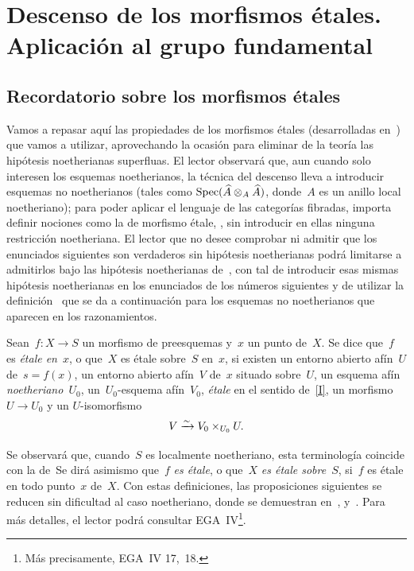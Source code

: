 \chapter[Descenso de los morfismos étales]{Descenso de los morfismos étales.\\ Aplicación al grupo fundamental}
\label{IX}

\section{Recordatorio sobre los morfismos étales}
\label{IX.1}

Vamos a repasar aquí las propiedades de los morfismos étales (desarrolladas
en~) que vamos a utilizar, aprovechando la ocasión para eliminar de
la teoría las hipótesis noetherianas superfluas. El lector observará que,
aun cuando solo interesen los esquemas noetherianos, la técnica del descenso
lleva a introducir esquemas no noetherianos (tales como
$\operatorname{Spec}(\widehat{A}\otimes_{A}\widehat{A})$, donde~$A$ es un anillo local
noetheriano); para poder aplicar el lenguaje de las categorías fibradas,
importa definir nociones como la de morfismo étale,
, sin introducir en ellas ninguna
restricción noetheriana.
El lector que no desee comprobar ni admitir que los enunciados siguientes
son verdaderos sin hipótesis noetherianas podrá limitarse a admitirlos bajo
las hipótesis noetherianas de~, con tal de introducir esas mismas
hipótesis noetherianas en los enunciados de los números siguientes y de
utilizar la definición~ que se da a continuación para los
esquemas no noetherianos que aparecen en los razonamientos.

\begin{definition}
\label{IX.1.1}
Sean~$f\colon X\to S$ un morfismo de preesquemas y~$x$ un punto de~$X$.
Se dice que~$f$ es \emph{étale en}~$x$,
%
o que~$X$ es étale sobre~$S$ en~$x$, si existen un entorno abierto
afín~$U$ de~$s=f(x)$, un entorno abierto afín~$V$ de~$x$ situado sobre~$U$,
un esquema afín \emph{noetheriano}~$U_{0}$, un~$U_{0}$-esquema
afín~$V_{0}$, \emph{étale} en el sentido de~\eqref{I}, un
morfismo~$U\to U_{0}$ y un
$U$-isomorfismo
$$
V\xrightarrow{\sim} V_{0}\times_{U_{0}}U.
$$
\end{definition}

Se observará
que, cuando~$S$ es localmente noetheriano, esta terminología coincide con
la de~\loccit Se dirá asimismo que~$f$ \emph{es étale}, o que~$X$
\emph{es étale sobre}~$S$, si~$f$ es étale en todo punto~$x$ de~$X$.
Con estas definiciones, las proposiciones siguientes se reducen sin
dificultad al caso noetheriano, donde se demuestran en~,
 y~. Para más detalles, el lector podrá consultar
EGA~IV\footnote{Más precisamente, EGA~IV 17,~18.}.

